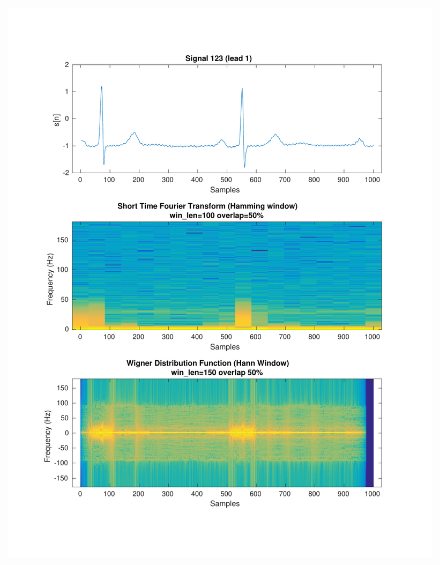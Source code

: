 \documentclass[11pt,a4paper]{article}
\begin{document}
\begin{figure}[H]
\centering
\begin{minipage}{0.48\textwidth}
	\centering
	\includegraphics[width=\textwidth]{fig/123l1_stft_wdf.pdf}
	

\end{minipage}
\end{figure}
\end{document}
